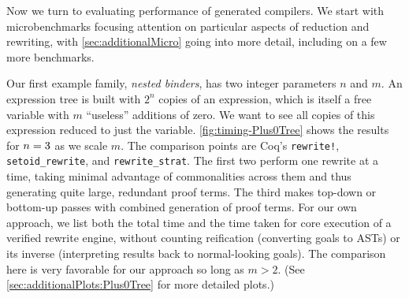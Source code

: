 \documentclass[a4paper,USenglish,cleveref,autoref,thm-restate]{lipics-v2021}
\begin{document}

Now we turn to evaluating performance of generated compilers.
We start with microbenchmarks focusing attention on particular aspects of reduction and rewriting, with \autoref{sec:additionalMicro} going into more detail, including on a few more benchmarks.

Our first example family, \emph{nested binders}, has two integer parameters $n$ and $m$.
An expression tree is built with $2^n$ copies of an expression, which is itself a free variable with $m$ ``useless'' additions of zero.
We want to see all copies of this expression reduced to just the variable.
\autoref{fig:timing-Plus0Tree} shows the results for $n = 3$ as we scale $m$.
The comparison points are Coq's \texttt{rewrite!}, \texttt{setoid\_rewrite}, and \texttt{rewrite\_strat}.
The first two perform one rewrite at a time, taking minimal advantage of commonalities across them and thus generating quite large, redundant proof terms.
The third makes top-down or bottom-up passes with combined generation of proof terms.
For our own approach, we list both the total time and the time taken for core execution of a verified rewrite engine, without counting reification (converting goals to ASTs) or its inverse (interpreting results back to normal-looking goals).
The comparison here is very favorable for our approach so long as $m > 2$.
(See \autoref{sec:additionalPlots:Plus0Tree} %
for more detailed plots.)
\end{document}

